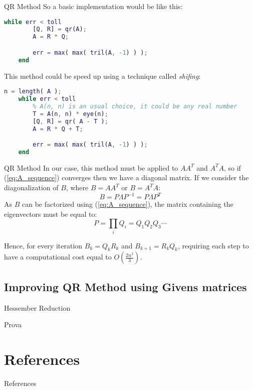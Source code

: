 \documentclass[10pt]{beamer}
\begin{document}
\begin{frame}[fragile]{QR Method}
    So a basic implementation would be like this:
    \begin{lstlisting}[language=Matlab]
    while err < toll
        [Q, R] = qr(A);
        A = R * Q;

        err = max( max( tril(A, -1) ) );
    end \end{lstlisting}
    This method could be speed up using a technique called \textit{shifing}:
    \begin{lstlisting}[language=Matlab]
    n = length( A );
    while err < toll
        % A(n, n) is an usual choice, it could be any real number
        T = A(n, n) * eye(n);
        [Q, R] = qr( A - T );
        A = R * Q + T;

        err = max( max( tril(A, -1) ) );
    end \end{lstlisting}
\end{frame}

\begin{frame}{QR Method}
    In our case, this method must be applied to $A A^T$ and $A^T A$, so if (\ref{eq:A_sequence}) converges then we have a diagonal matrix. \newline
    If we consider the diagonalization of $B$, where $B = A A^T$ or $B = A^T A$:
    $$
    B = P \Lambda P^{-1} =  P \Lambda P^T
    $$
    As $B$ can be factorized using (\ref{eq:A_sequence}), the matrix containing the eigenvectors must be equal to:
    $$
    P = \prod_i Q_i = Q_1 Q_2 Q_3 \cdots
    $$ \bigskip

    Hence, for every iteration $B_k = Q_k R_k$ and $B_{k+1} = R_k Q_k$, requiring each step to have a computational cost equal to $O(\frac{2 n^3}{3})$.
\end{frame}

\subsection{Improving QR Method using Givens matrices}

\begin{frame}{Hessember Reduction}

\end{frame}

\begin{frame}{Prova}
    
\end{frame}

\section{References}
\begin{frame}{References}
    \printbibliography
\end{frame}
\end{document}

